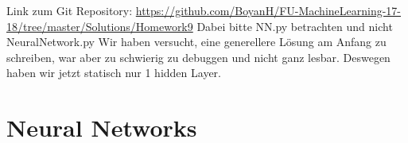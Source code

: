 \usepackage{graphicx}
\usepackage{amsmath}
\usepackage{amssymb}
\usepackage{fancyvrb}

\newcommand{\dozent}{Prof. R. Rojas}					%
\newcommand{\projectNo}{9}
\newcommand{\veranstaltung}{Mustererkennung}
\newcommand{\semester}{WS17/18}
\newcommand{\studenten}{Boyan Hristov, Nedeltscho Petrov}





Link zum Git Repository: \url{https://github.com/BoyanH/FU-MachineLearning-17-18/tree/master/Solutions/Homework\projectNo}
Dabei bitte NN.py betrachten und nicht NeuralNetwork.py
Wir haben versucht, eine generellere Lösung am Anfang zu schreiben, war aber zu schwierig zu debuggen und nicht
ganz lesbar. Deswegen haben wir jetzt statisch nur 1 hidden Layer.

\section*{Neural Networks}




